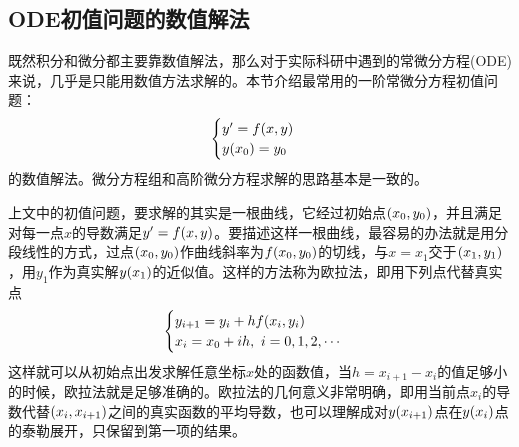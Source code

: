 \documentclass[12pt,a4paper,openany,twoside]{book}
\numberwithin{equation}{section}
\begin{document}
          \subsection{ODE初值问题的数值解法}
            既然积分和微分都主要靠数值解法，那么对于实际科研中遇到的常微分方程(ODE)来说，几乎是只能用数值方法求解的。本节介绍最常用的一阶常微分方程初值问题：
            \begin{equation*}
              \begin{cases}
                y'=f\qty(x,y)\\
                y\qty(x_0)=y_0
              \end{cases}
            \end{equation*}
            的数值解法。微分方程组和高阶微分方程求解的思路基本是一致的。

            上文中的初值问题，要求解的其实是一根曲线，它经过初始点$\qty(x_0,y_0)$，并且满足对每一点$x$的导数满足$y'=f\qty(x,y)$。要描述这样一根曲线，最容易的办法就是用分段线性的方式，过点$\qty(x_0,y_0)$作曲线斜率为$f\qty(x_0,y_0)$的切线，与$x=x_1$交于$\qty(x_1,y_1)$，用$y_1$作为真实解$y\qty(x_1)$的近似值。这样的方法称为欧拉法，即用下列点代替真实点
            \begin{equation}
              \begin{cases}
                y_{i+1}=y_i+hf\qty(x_i, y_i)\\
                x_i=x_0+ih,\ i=0,1,2,\cdots
              \end{cases}
            \end{equation}
            这样就可以从初始点出发求解任意坐标$x$处的函数值，当$h=x_{i+1}-x_i$的值足够小的时候，欧拉法就是足够准确的。欧拉法的几何意义非常明确，即用当前点$x_i$的导数代替$\qty(x_i,x_{i+1})$之间的真实函数的平均导数，也可以理解成对$y\qty(x_{i+1})$点在$y\qty(x_i)$点的泰勒展开，只保留到第一项的结果。
\end{document}
